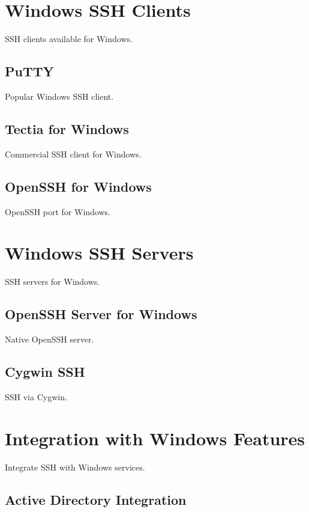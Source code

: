 \documentclass[12pt]{book}
\begin{document}
\section{Windows SSH Clients}

SSH clients available for Windows.

\subsection{PuTTY}

Popular Windows SSH client.

\subsection{Tectia for Windows}

Commercial SSH client for Windows.

\subsection{OpenSSH for Windows}

OpenSSH port for Windows.

\section{Windows SSH Servers}

SSH servers for Windows.

\subsection{OpenSSH Server for Windows}

Native OpenSSH server.

\subsection{Cygwin SSH}

SSH via Cygwin.

\section{Integration with Windows Features}

Integrate SSH with Windows services.

\subsection{Active Directory Integration}
\end{document}
